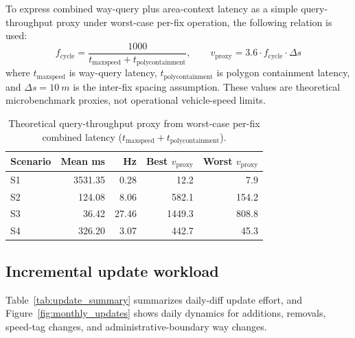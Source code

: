 \documentclass[conference]{IEEEtran}
\begin{document}
To express combined way-query plus area-context latency as a simple query-throughput proxy under worst-case per-fix operation, the following relation is used:
\begin{equation}
f_{\text{cycle}}=\frac{1000}{t_{\text{maxspeed}}+t_{\text{polycontainment}}}, \qquad
v_{\text{proxy}}=3.6\cdot f_{\text{cycle}} \cdot \Delta s
\label{eq:speed}
\end{equation}
where \(t_{\text{maxspeed}}\) is way-query latency, \(t_{\text{polycontainment}}\) is polygon containment latency, and \(\Delta s=\SI{10}{m}\) is the inter-fix spacing assumption. These values are theoretical microbenchmark proxies, not operational vehicle-speed limits.

\begin{table}[!t]
\caption{Theoretical query-throughput proxy from worst-case per-fix combined latency (\(t_{\text{maxspeed}}+t_{\text{polycontainment}}\)).}
\label{tab:device_speed_envelope}
\centering
\begin{tabular}{lrrrr}
\toprule
Scenario & Mean ms & Hz & Best \(v_{\text{proxy}}\) & Worst \(v_{\text{proxy}}\) \\
\midrule
S1 & 3531.35 & 0.28 & 12.2 & 7.9 \\
S2 & 124.08 & 8.06 & 582.1 & 154.2 \\
S3 & 36.42 & 27.46 & 1449.3 & 808.8 \\
S4 & 326.20 & 3.07 & 442.7 & 45.3 \\
\bottomrule
\end{tabular}
\end{table}

\subsection{Incremental update workload}
Table~\ref{tab:update_summary} summarizes daily-diff update effort, and Figure~\ref{fig:monthly_updates} shows daily dynamics for additions, removals, speed-tag changes, and administrative-boundary way changes.
\end{document}
